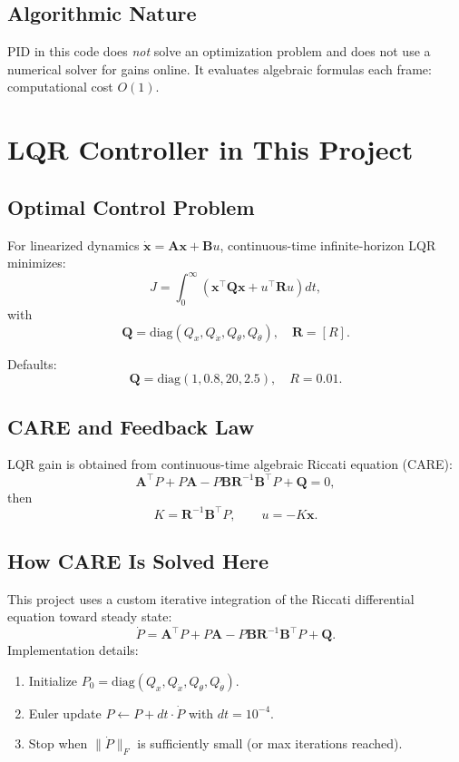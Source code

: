 \documentclass[11pt,a4paper]{article}
\newcommand{\state}{\mathbf{x}}
\newcommand{\A}{\mathbf{A}}
\newcommand{\B}{\mathbf{B}}
\newcommand{\Q}{\mathbf{Q}}
\newcommand{\R}{\mathbf{R}}
\begin{document}
\subsection{Algorithmic Nature}
PID in this code does \emph{not} solve an optimization problem and does not use a numerical solver for gains online. It evaluates algebraic formulas each frame: computational cost $O(1)$.

\section{LQR Controller in This Project}
\subsection{Optimal Control Problem}
For linearized dynamics $\dot{\state}=\A\state+\B u$, continuous-time infinite-horizon LQR minimizes:
\begin{equation}
J=\int_0^\infty \left(\state^\top\Q\state + u^\top\R u\right)dt,
\end{equation}
with
\begin{equation}
\Q=\text{diag}(Q_x,Q_{\dot{x}},Q_\theta,Q_{\dot{\theta}}),\quad \R=[R].
\end{equation}

Defaults:
\begin{equation}
\Q=\text{diag}(1,0.8,20,2.5),\quad R=0.01.
\end{equation}

\subsection{CARE and Feedback Law}
LQR gain is obtained from continuous-time algebraic Riccati equation (CARE):
\begin{equation}
\A^\top P + P\A - P\B\R^{-1}\B^\top P + \Q = 0,
\end{equation}
then
\begin{equation}
K=\R^{-1}\B^\top P,\qquad u=-K\state.
\end{equation}

\subsection{How CARE Is Solved Here}
This project uses a custom iterative integration of the Riccati differential equation toward steady state:
\begin{equation}
\dot{P} = \A^\top P + P\A - P\B\R^{-1}\B^\top P + \Q.
\end{equation}
Implementation details:
\begin{enumerate}[label=\arabic*.]
  \item Initialize $P_0=\text{diag}(Q_x,Q_{\dot{x}},Q_\theta,Q_{\dot{\theta}})$.
  \item Euler update $P \leftarrow P + dt\cdot \dot{P}$ with $dt=10^{-4}$.
  \item Stop when $\|\dot{P}\|_F$ is sufficiently small (or max iterations reached).
\end{enumerate}
\end{document}
